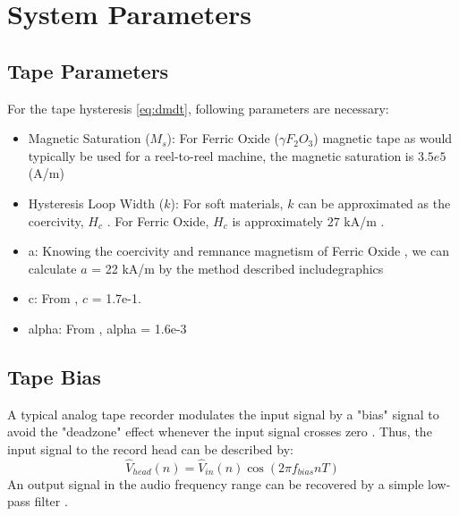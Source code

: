 \documentclass[twoside,a4paper]{article}
\begin{document}
\section{System Parameters}
\subsection {Tape Parameters}
For the tape hysteresis \cref{eq:dmdt}, following parameters are necessary:
\begin{itemize}
\item Magnetic Saturation ($M_s$): For Ferric Oxide ($\gamma F_2O_3$)
magnetic tape as would typically be used for a reel-to-reel machine,
the magnetic saturation is $3.5e5$ (A/m) \cite{jilesBook}
\item Hysteresis Loop Width ($k$): For soft materials, $k$ can be approximated
as the coercivity, $H_c$ \cite{Jiles1992}. For Ferric Oxide, $H_c$ is approximately
$27$ kA/m \cite{jilesBook}.
\item a: Knowing the coercivity and remnance magnetism of Ferric Oxide
\cite{jilesBook}, we can calculate $a$ = 22  kA/m by the method described includegraphics
\cite{Jiles1992}
\item c: From \cite{Jiles1992}, $c$ = 1.7e-1.
\item alpha: From \cite{Jiles1992}, alpha = 1.6e-3
\end{itemize}

\subsection{Tape Bias}
A typical analog tape recorder modulates the input signal by a
"bias" signal to avoid the "deadzone" effect whenever the input
signal crosses zero \cite{Camras:1987:MRH:27189}. Thus, the
input signal to the record head can be described by:
\begin{equation}
    \hat{V}_{head}(n) = \hat{V}_{in}(n) \cos(2 \pi f_{bias} n T)
\end{equation}
%
An output signal in the audio frequency range can be recovered
by a simple low-pass filter \cite{Camras:1987:MRH:27189}.


\nocite{*}


\end{document}
